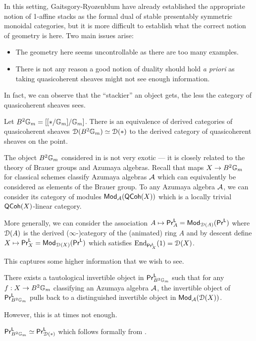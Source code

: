 In this setting, Gaitsgory-Ryozenblum have already established the appropriate notion of 1-affine stacks as the formal dual of stable presentably symmetric monoidal categories, but it is more difficult to establish what the correct notion of geometry is here. Two main issues arise: 
\begin{itemize}
    \item The geometry here seems uncontrollable as there are too many examples. 
    \item There is not any reason a good notion of duality should hold \emph{a priori} as taking quasicoherent sheaves might not see enough information. 
\end{itemize}
In fact, we can observe that the ``stackier'' an object gets, the less the category of quasicoherent sheaves sees. 
\begin{example}\label{ex: B2Gm}
    Let $B^{2}\mathbb{G}_{m}=[[*/\mathbb{G}_{m}]/\mathbb{G}_{m}]$. There is an equivalence of derived categories of quasicoherent sheaves $\EuScript{D}(B^{2}\mathbb{G}_{m})\simeq\EuScript{D}(*)$ to the derived category of quasicoherent sheaves on the point. 
\end{example}
The object $B^{2}\mathbb{G}_{m}$ considered in \label{ex: B2Gm} is not very exotic --- it is closely related to the theory of Brauer groups and Azumaya algebras. Recall that maps $X\to B^{2}\mathbb{G}_{m}$ for classical schemes classify Azumaya algebras $\mathcal{A}$ which can equivalently be considered as elements of the Brauer group. To any Azumaya algebra $\mathcal{A}$, we can consider its category of modules $\mathsf{Mod}_{\mathcal{A}}(\mathsf{QCoh}(X))$ which is a locally trivial $\mathsf{QCoh}(X)$-linear category. 

More generally, we can consider the association $A\mapsto\mathsf{Pr}^{\mathsf{L}}_{A}=\mathsf{Mod}_{\EuScript{D}(A)}(\mathsf{Pr}^{\mathsf{L}})$ where $\EuScript{D}(A)$ is the derived ($\infty$-)category of the (animated) ring $A$ and by descent define $X\mapsto\mathsf{Pr}^{\mathsf{L}}_{X}=\mathsf{Mod}_{\EuScript{D}(X)}(\mathsf{Pr}^{\mathsf{L}})$ which satisfies $\mathrm{End}_{\mathsf{Pr}^{\mathsf{L}}_{X}}(1)=\EuScript{D}(X)$. 

This captures some higher information that we wish to see. 
\begin{example}
    There exists a tautological invertible object in $\mathsf{Pr}^{\mathsf{L}}_{B^{2}\mathbb{G}_{m}}$ such that for any $f:X\to B^{2}\mathbb{G}_{m}$ classifying an Azumaya algebra $\mathcal{A}$, the invertible object of $\mathsf{Pr}^{\mathsf{L}}_{B^{2}\mathbb{G}_{m}}$ pulls back to a distinguished invertible object in $\mathsf{Mod}_{\mathcal{A}}(\EuScript{D}(X))$. 
\end{example}
However, this is at times not enough. 
\begin{example}
    $\mathsf{Pr}^{\mathsf{L}}_{B^{2}\mathbb{G}_{m}}\simeq\mathsf{Pr}^{\mathsf{L}}_{\EuScript{D}(*)}$ which follows formally from . 
\end{example}

